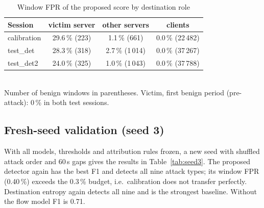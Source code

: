 \documentclass[conference]{IEEEtran}
\begin{document}
\begin{table}[t]
\caption{Window FPR of the proposed score by destination role}
\label{tab:role}
\centering
\setlength{\tabcolsep}{4pt}
\begin{tabular}{lccc}
\toprule
Session & victim server & other servers & clients \\
\midrule
calibration & 29.6\,\% (223) & 1.1\,\% (661) & 0.0\,\% (22\,482) \\
test\_det & 28.3\,\% (318) & 2.7\,\% (1\,014) & 0.0\,\% (37\,267) \\
test\_det2 & 24.0\,\% (325) & 1.0\,\% (1\,043) & 0.0\,\% (37\,788) \\
\bottomrule
\end{tabular}\\[2pt]
\footnotesize Number of benign windows in parentheses. Victim, first benign period (pre-attack): 0\,\% in both test sessions.
\end{table}

\subsection{Fresh-seed validation (seed 3)}\label{sec:seed3}
With all models, thresholds and attribution rules frozen, a new seed with shuffled attack order and 60\,s gaps gives the results in Table~\ref{tab:seed3}. The proposed detector again has the best F1 and detects all nine attack types; its window FPR (0.40\,\%) exceeds the 0.3\,\% budget, i.e.\ calibration does not transfer perfectly. Destination entropy again detects all nine and is the strongest baseline. Without the flow model F1 is 0.71.
\end{document}
